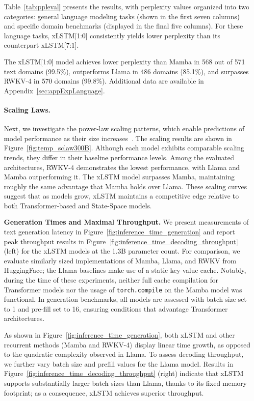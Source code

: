Table~\ref{tab:ppleval} presents the results, with perplexity values organized into two categories: general language modeling tasks (shown in the first seven columns) and specific domain benchmarks (displayed in the final five columns). For these language tasks, xLSTM[1:0] consistently yields lower perplexity than its counterpart xLSTM[7:1].

The xLSTM[1:0] model achieves lower perplexity than Mamba in 568 out of 571 text domains (99.5\%), outperforms Llama in 486 domains (85.1\%), and surpasses RWKV-4 in 570 domains (99.8\%). Additional data are available in Appendix~\ref{sec:appExpLanguage}.

\paragraph{Scaling Laws.} Next, we investigate the power-law scaling patterns, which enable predictions of model performance as their size increases~\citep{Kaplan:20,Brown:20short}. 
The scaling results are shown in Figure~\ref{fig:temp_sclaw300B}. Although each model exhibits comparable scaling trends, they differ in their baseline performance levels. Among the evaluated architectures, RWKV-4 demonstrates the lowest performance, with Llama and Mamba outperforming it. The xLSTM model surpasses Mamba, maintaining roughly the same advantage that Mamba holds over Llama. These scaling curves suggest that as models grow, xLSTM maintains a competitive edge relative to both Transformer-based and State-Space models.

\textbf{Generation Times and Maximal Throughput.} We present measurements of text generation latency in Figure~\ref{fig:inference_time_generation} and report peak throughput results in Figure~\ref{fig:inference_time_decoding_throughput} (left) for the xLSTM models at the 1.3B parameter count. For comparison, we evaluate similarly sized implementations of Mamba, Llama, and RWKV from HuggingFace; the Llama baselines make use of a static key-value cache. Notably, during the time of these experiments, neither full cache compilation for Transformer models nor the usage of \texttt{torch.compile} on the Mamba model was functional. In generation benchmarks, all models are assessed with batch size set to 1 and pre-fill set to 16, ensuring conditions that advantage Transformer architectures.

As shown in Figure~\ref{fig:inference_time_generation}, both xLSTM and other recurrent methods (Mamba and RWKV-4) display linear time growth, as opposed to the quadratic complexity observed in Llama. To assess decoding throughput, we further vary batch size and prefill values for the Llama model. Results in Figure~\ref{fig:inference_time_decoding_throughput} (right) indicate that xLSTM supports substantially larger batch sizes than Llama, thanks to its fixed memory footprint; as a consequence, xLSTM achieves superior throughput.

